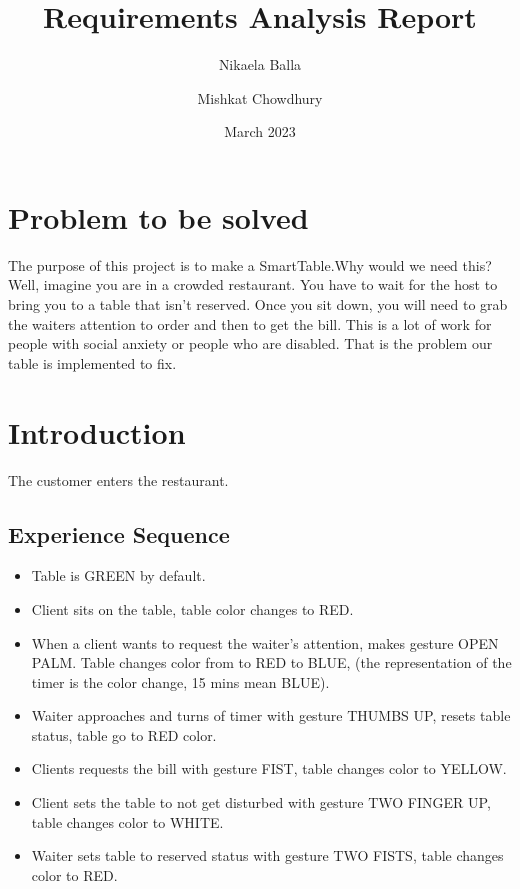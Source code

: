 \documentclass{article}
\title{Requirements Analysis Report}
\author{Nikaela Balla }
\author{Mishkat Chowdhury}
\date{March 2023}
\begin{document}
\maketitle

\section{ Problem to be solved}
\label{sec:problem}
The purpose of this project is to make a SmartTable.Why would we need this? 
Well, imagine you are in a crowded restaurant. You have to wait for the host to bring you to a table that isn't reserved. Once you sit down,
you will need to grab the waiters attention to order and then to get the bill. This is a lot of work for people with social anxiety or people 
who are disabled. That is the problem our table is implemented to fix.
\section{ Introduction}
The customer enters the restaurant.
\subsection{Experience Sequence}
\begin{itemize}
    \item Table is GREEN by default.
    \item Client sits on the table, table color changes to RED.
    \item When a client wants to request the waiter's attention, makes gesture OPEN PALM. Table changes color from to RED to BLUE, (the representation of the timer is the color change, 15 mins mean BLUE).
    \item Waiter approaches and turns of timer with gesture THUMBS UP, resets table status, table go to RED color.
    \item Clients requests the bill with gesture FIST, table changes color to YELLOW.
    \item Client sets the table to not get disturbed with gesture TWO FINGER UP, table changes color to WHITE.
    \item Waiter sets table to reserved status with gesture TWO FISTS, table changes color to RED.
\end{itemize}
\end{document}
